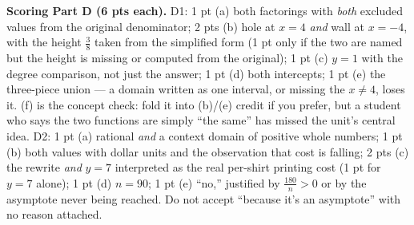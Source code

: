 \documentclass[10pt]{article}
\begin{document}
\begin{enumerate}[leftmargin=1.9em, itemsep=16pt]
\begin{teachernote}
\textbf{Scoring Part D (6 pts each).} D1: 1 pt (a) both factorings with \emph{both} excluded values
from the original denominator; 2 pts (b) hole at $x=4$ \emph{and} wall at $x=-4$, with the height
$\tfrac38$ taken from the simplified form (1 pt only if the two are named but the height is missing
or computed from the original); 1 pt (c) $y=1$ with the degree comparison, not just the answer;
1 pt (d) both intercepts; 1 pt (e) the three-piece union --- a domain written as one interval, or
missing the $x\ne4$, loses it. (f) is the concept check: fold it into (b)/(e) credit if you prefer,
but a student who says the two functions are simply ``the same'' has missed the unit's central idea.
D2: 1 pt (a) rational \emph{and} a context domain of positive whole numbers; 1 pt (b) both values
with dollar units and the observation that cost is falling; 2 pts (c) the rewrite \emph{and}
$y=7$ interpreted as the real per-shirt printing cost (1 pt for $y=7$ alone); 1 pt (d) $n=90$;
1 pt (e) ``no,'' justified by $\tfrac{180}{n}>0$ or by the asymptote never being reached. Do not
accept ``because it's an asymptote'' with no reason attached.
\end{teachernote}

\end{enumerate}
\end{document}
